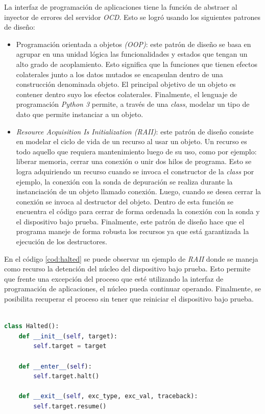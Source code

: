 La interfaz de programación de aplicaciones tiene la función de abstraer al inyector de errores del servidor \emph{OCD}.
Esto se logró usando los siguientes patrones de diseño:

\begin{itemize}
    \item Programación orientada a objetos \emph{(OOP)}: este patrón de diseño se basa en agrupar en una unidad lógica las funcionalidades y estados que tengan un alto grado de acoplamiento.
        Esto significa que la funciones que tienen efectos colaterales junto a los datos mutados se encapsulan dentro de una construcción denominada objeto.
        El principal objetivo de un objeto es contener dentro suyo los efectos colaterales.
        Finalmente, el lenguaje de programación \emph{Python 3} permite, a través de una \emph{class}, modelar un tipo de dato que permite instanciar a un objeto.
    \item \emph{Resource Acquisition Is Initialization (RAII)}: este patrón de diseño consiste en modelar el ciclo de vida de un recurso al usar un objeto.
        Un recurso es todo aquello que requiera mantenimiento luego de su uso, como por ejemplo: liberar memoria, cerrar una conexión o unir dos hilos de programa.
        Esto se logra adquiriendo un recurso cuando se invoca el constructor de la \emph{class} por ejemplo, la conexión con la sonda de depuración se realiza durante la instanciación de un objeto llamado conexión.
        Luego, cuando se desea cerrar la conexión se invoca al destructor del objeto.
        Dentro de esta función se encuentra el código para cerrar de forma ordenada la conexión con la sonda y el dispositivo bajo prueba.
        Finalmente, este patrón de diseño hace que el programa maneje de forma robusta los recursos ya que está garantizada la ejecución de los destructores.
\end{itemize}

En el código \ref{cod:halted} se puede observar un ejemplo de \emph{RAII} donde se maneja como recurso la detención del núcleo del dispositivo bajo prueba.
Esto permite que frente una excepción del proceso que esté utilizando la interfaz de programación de aplicaciones, el núcleo pueda continuar operando.
Finalmente, se posibilita recuperar el proceso sin tener que reiniciar el dispositivo bajo prueba.

\begin{lstlisting}[language=Python,label=cod:halted,caption=Ejemplo de \emph{Resource Acquisition Is Initialization (RAII)}.]  % Start your code-block

class Halted():
    def __init__(self, target):
        self.target = target

    def __enter__(self):
        self.target.halt()

    def __exit__(self, exc_type, exc_val, traceback):
        self.target.resume()

\end{lstlisting}

